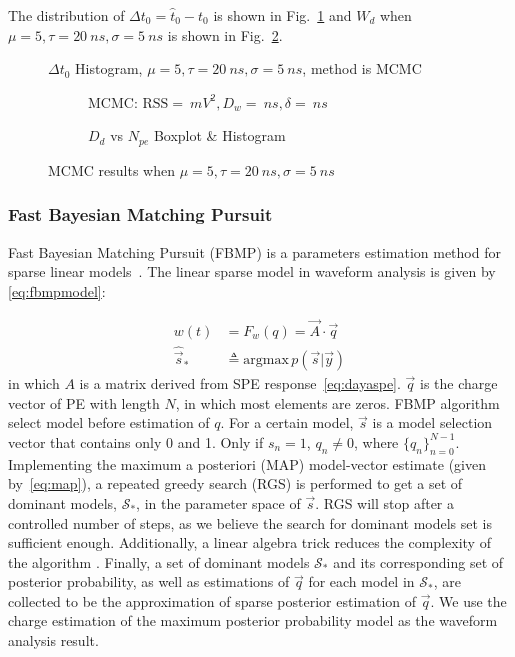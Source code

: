 The distribution of $\Delta{t_0} = \hat{t}_0 - t_0$ is shown in Fig.~\ref{fig:mcmc-t0hist} and $W_d$ when $\mu=5, \tau=\SI{20}{ns}, \sigma=\SI{5}{ns}$ is shown in Fig.~\ref{fig:mcmc}.
\begin{figure}[H]
    \centering
    \resizebox{0.5\textwidth}{!}{}
    \caption{\label{fig:mcmc-t0hist} $\Delta t_{0}$ Histogram, $\mu=5, \tau=\SI{20}{ns}, \sigma=\SI{5}{ns}$, method is MCMC}
\end{figure}

\begin{figure}[H]
  \begin{subfigure}{.5\textwidth}
    \centering
    \resizebox{\textwidth}{!}{}
    \caption{\label{fig:mcmc}MCMC: $\mathrm{RSS}=\SI{}{mV^2},D_w=\SI{}{ns},\delta=\SI{}{ns}$}
  \end{subfigure}
  \begin{subfigure}{.5\textwidth}
    \centering
    \resizebox{\textwidth}{!}{}
    \caption{\label{fig:mcmc-npe} $D_d$ vs $N_{pe}$ Boxplot \& Histogram}
  \end{subfigure}
  \caption{MCMC results when $\mu=5, \tau=\SI{20}{ns}, \sigma=\SI{5}{ns}$}
\end{figure}

\subsubsection{Fast Bayesian Matching Pursuit}

Fast Bayesian Matching Pursuit (FBMP) is a parameters estimation method for sparse linear models~\cite{schniter_fast_nodate}. The linear sparse model in waveform analysis is given by \eqref{eq:fbmpmodel}: 

\begin{align}
    w(t) &= F_{w}(q) = \vec{A}\cdot \vec{q} \label{eq:fbmpmodel} \\
    \hat{\vec{s}}_{*} &\triangleq \mathrm{argmax}\,p(\vec{s}|\vec{y}) \label{eq:map}
\end{align}
in which $A$ is a matrix derived from SPE response~\eqref{eq:dayaspe}. $\vec{q}$ is the charge vector of PE with length $N$, in which most elements are zeros. FBMP algorithm select model before estimation of $q$. For a certain model, $\vec{s}$ is a model selection vector that contains only 0 and 1. Only if $s_{n}=1$, $q_{n}\neq0$, where $\{q_{n}\}_{n=0}^{N-1}$. Implementing the maximum a posteriori (MAP) model-vector estimate (given by~\eqref{eq:map}), a repeated greedy search (RGS) is performed to get a set of dominant models, $\mathcal{S}_{*}$, in the parameter space of $\vec{s}$. RGS will stop after a controlled number of steps, as we believe the search for dominant models set is sufficient enough. Additionally, a linear algebra trick reduces the complexity of the algorithm \cite{schniter_fast_nodate}. Finally, a set of dominant models $\mathcal{S}_{*}$ and its corresponding set of posterior probability, as well as estimations of $\vec{q}$ for each model in $\mathcal{S}_{*}$, are collected to be the approximation of sparse posterior estimation of $\vec{q}$. We use the charge estimation of the maximum posterior probability model as the waveform analysis result. 

